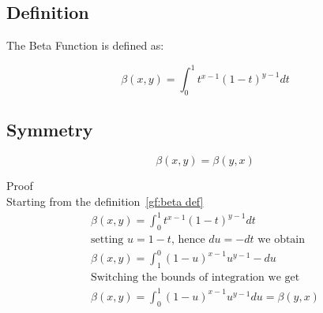 \documentclass[a4paper]{article}
\begin{document}
    \subsection{Definition}\label{gf:subsec:definition2}
    The Beta Function is defined as:
    \begin{definition}
        \label{gf:beta def}
        \[
        \beta(x, y) = \int_{0}^{1} t^{x-1} (1-t)^{y-1} dt
        \]
    \end{definition}

    \subsection{Symmetry}\label{gf:subsec:symmetry}
    \begin{theorem}
        \begin{equation}
            \beta(x, y) = \beta(y, x) \label{gf:eq:equation23}
        \end{equation}

        Proof
        \\
        Starting from the definition~\ref{gf:beta def}
        \begin{gather*}
            \beta(x, y) = \int_{0}^{1} t^{x-1} (1-t)^{y-1} dt
            \\
            \text{setting $u = 1-t$, hence $du = -dt$ we obtain}
            \\
            \beta(x, y) = \int_{1}^{0} (1-u)^{x-1} {u}^{y-1} -du
            \\
            \text{Switching the bounds of integration we get}
            \\
            \beta(x, y) = \int_{0}^{1} (1-u)^{x-1} {u}^{y-1} du = \beta(y, x)
        \end{gather*}
    \end{theorem}
\end{document}
